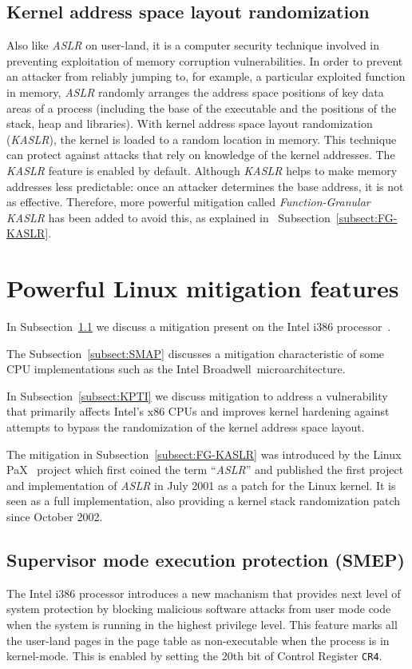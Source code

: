 \documentclass{masterthesis}
\newcommand{\refToSubSection}[1]{Subsection~\ref{subsect:#1}\xspace}
\begin{document}
\subsection{Kernel address space layout randomization}
\label{subsect:KASLR}
Also like \emph{ASLR} on user-land, it is a computer security technique involved in preventing exploitation of memory corruption vulnerabilities. 
In order to prevent an attacker from reliably jumping to, for example, a particular exploited function in memory, \emph{ASLR} randomly arranges the address space positions of key data areas of a process (including the base of the executable and the positions of the stack, heap and libraries).
With kernel address space layout randomization (\emph{KASLR}), the kernel is loaded to a random location in memory.
This technique can protect against attacks that rely on knowledge of the kernel addresses.
The \emph{KASLR} feature is enabled by default.
Although \emph{KASLR} helps to make memory addresses less predictable: once an attacker determines the base address, it is not as effective.
Therefore, more powerful mitigation called \emph{Function-Granular KASLR} has been added to avoid this, as explained in ~\refToSubSection{FG-KASLR}.

\section{Powerful Linux mitigation features}
\label{sect:powerful mitigation}
In \refToSubSection{SMEP} we discuss a mitigation present on the Intel i386 processor~\cite{inteli386}.

The \refToSubSection{SMAP} discusses a mitigation characteristic of some CPU implementations such as the Intel Broadwell~\cite{nalamalpu2015broadwell}microarchitecture.

In \refToSubSection{KPTI} we discuss mitigation to address a vulnerability that primarily affects Intel's x86 CPUs and improves kernel hardening against attempts to bypass the randomization of the kernel address space layout.

The mitigation in \refToSubSection{FG-KASLR} was introduced by the Linux PaX~\cite{marco2016exploiting} project which first coined the term ``\emph{ASLR}'' and published the first project and implementation of \emph{ASLR} in July 2001 as a patch for the Linux kernel. It is seen as a full implementation, also providing a kernel stack randomization patch since October 2002.
\subsection{Supervisor mode execution protection (SMEP)}
\label{subsect:SMEP}
The Intel i386 processor introduces a new machanism that provides next level of system protection by blocking malicious software attacks from user mode code when the system is running in the highest privilege level.
This feature marks all the user-land pages in the page table as non-executable when the process is in kernel-mode. This is enabled by setting the 20th bit of Control Register \texttt{CR4}.
\end{document}

